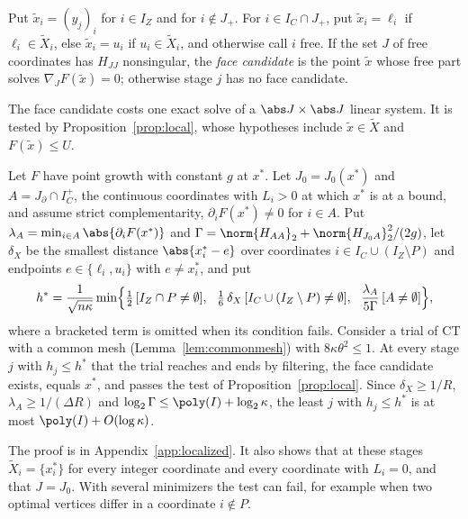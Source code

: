 \begin{definition}\label{def:facecand}
Put $\tilde x_i=(y_j)_i$ for $i\in I_Z$ and for $i\notin J_+$. For
$i\in I_C\cap J_+$, put $\tilde x_i=\ell_i$ if $\ell_i\in\tilde X_i$, else
$\tilde x_i=u_i$ if $u_i\in\tilde X_i$, and otherwise call $i$ free. If the
set $J$ of free coordinates has $H_{JJ}$ nonsingular, the \emph{face
candidate} is the point $\tilde x$ whose free part solves
$\nabla_JF(\tilde x)=0$; otherwise stage $j$ has no face candidate.
\end{definition}

The face candidate costs one exact solve of a $\abs J\times\abs J$ linear
system. It is tested by Proposition~\ref{prop:local}, whose hypotheses
include $\tilde x\in\tilde X$ and $F(\tilde x)\le U$.

\begin{corollary}\label{cor:local}
Let $F$ have point growth with constant $g$ at $x^*$. Let $J_0=J_0(x^*)$ and
$A=J_\partial\cap I_C^+$, the continuous coordinates with $L_i>0$ at which
$x^*$ is at a bound, and assume strict complementarity,
$\partial_iF(x^*)\ne0$ for $i\in A$. Put
$\lambda_A=\min_{i\in A}\abs{\partial_iF(x^*)}$ and
$\Gamma=\norm{H_{AA}}_2+\norm{H_{J_0A}}_2^2/(2g)$,
let $\delta_X$ be the smallest distance $\abs{x^*_i-e}$ over coordinates
$i\in I_C\cup(I_Z\setminus P)$ and endpoints $e\in\{\ell_i,u_i\}$ with
$e\ne x^*_i$, and put
\[
h^*=\frac1{\sqrt{n\kappa}}\min\Bigl\{\tfrac12\,[I_Z\cap P\ne\emptyset],\ \
\tfrac16\,\delta_X\,[I_C\cup(I_Z\setminus P)\ne\emptyset],\ \
\frac{\lambda_A}{5\Gamma}\,[A\ne\emptyset]\Bigr\},
\]
where a bracketed term is omitted when its condition fails. Consider a trial
of CT with a common mesh (Lemma~\ref{lem:commonmesh}) with
$8\kappa\theta^2\le1$. At every stage $j$ with $h_j\le h^*$ that the trial
reaches and ends by filtering, the face candidate exists, equals $x^*$, and
passes the test of Proposition~\ref{prop:local}. Since $\delta_X\ge1/R$,
$\lambda_A\ge1/(\Delta R)$ and $\log_2\Gamma\le\poly(I)+\log_2\kappa$, the
least $j$ with $h_j\le h^*$ is at most $\poly(I)+O(\log\kappa)$.
\end{corollary}

The proof is in Appendix~\ref{app:localized}. It also shows that at these
stages $\tilde X_i=\{x^*_i\}$ for every integer coordinate and every
coordinate with $L_i=0$, and that $J=J_0$. With several minimizers the test
can fail, for example when two optimal vertices differ in a coordinate
$i\notin P$.

